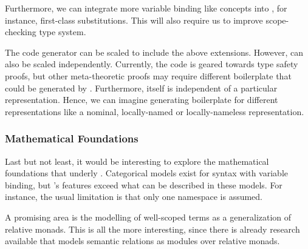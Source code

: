 Furthermore, we can integrate more variable binding like concepts into \Knot,
for instance, first-class substitutions. This will also require us to improve
\Knot scope-checking type system.

The \Needle code generator can be scaled to include the above extensions.
However, \Needle can also be scaled independently. Currently, the code is geared
towards type safety proofs, but other meta-theoretic proofs may require
different boilerplate that could be generated by \Needle. Furthermore, \Knot
itself is independent of a particular representation. Hence, we can imagine
generating boilerplate for different representations like a nominal,
locally-named or locally-nameless representation.


\subsubsection{Mathematical Foundations}

Last but not least, it would be interesting to explore the mathematical
foundations that underly \Knot. Categorical models exist for syntax with
variable binding, but \Knot's features exceed what can be described in these
models. For instance, the usual limitation is that only one namespace is
assumed.

A promising area is the modelling of well-scoped terms as a generalization of
relative monads. This is all the more interesting, since there is already
research available that models semantic relations as modules over relative monads.


